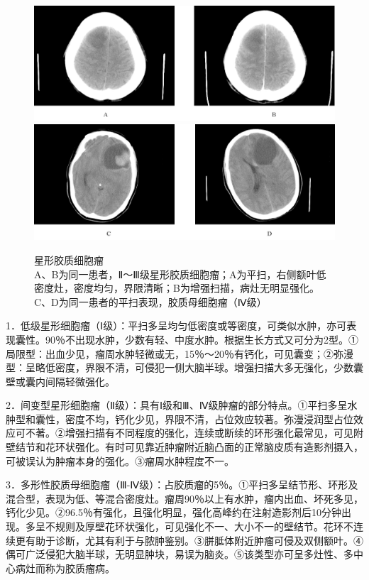 \begin{figure}[!htbp]
 \centering
 \includegraphics[width=.7\textwidth,height=\textheight,keepaspectratio]{./images/Image00066.jpg}
 \includegraphics[width=.7\textwidth,height=\textheight,keepaspectratio]{./images/Image00067.jpg}
 \captionsetup{justification=centering}
 \caption{星形胶质细胞瘤\\{\small A、B为同一患者，Ⅱ～Ⅲ级星形胶质细胞瘤；A为平扫，右侧额叶低密度灶，密度均匀，界限清晰；B为增强扫描，病灶无明显强化。C、D为同一患者的平扫表现，胶质母细胞瘤（Ⅳ级）}}
 \label{fig2-39}
  \end{figure} 

1．低级星形细胞瘤（Ⅰ级）：平扫多呈均匀低密度或等密度，可类似水肿，亦可表现囊性。90％不出现水肿，少数有轻、中度水肿。根据生长方式又可分为2型。①局限型：出血少见，瘤周水肿轻微或无，15％～20％有钙化，可见囊变；②弥漫型：呈略低密度，界限不清，可侵犯一侧大脑半球。增强扫描大多无强化，少数囊壁或囊内间隔轻微强化。

2．间变型星形细胞瘤（Ⅱ级）：具有Ⅰ级和Ⅲ、Ⅳ级肿瘤的部分特点。①平扫多呈水肿型和囊性，密度不均，钙化少见，界限不清，占位效应较著。弥漫浸润型占位效应可不著。②增强扫描有不同程度的强化，连续或断续的环形强化最常见，可见附壁结节和花环状强化。有时可见靠近肿瘤附近脑凸面的正常脑皮质有造影剂摄入，可被误认为肿瘤本身的强化。③瘤周水肿程度不一。

3．多形性胶质母细胞瘤（Ⅲ-Ⅳ级）：占胶质瘤的5％。①平扫多呈结节形、环形及混合型，表现为低、等混合密度灶。瘤周90％以上有水肿，瘤内出血、坏死多见，钙化少见。②96.5％有强化，且强化明显，强化高峰约在注射造影剂后10分钟出现。多呈不规则及厚壁花环状强化，可见强化不一、大小不一的壁结节。花环不连续更有助于诊断，尤其有利于与脓肿鉴别。③胼胝体附近肿瘤可侵及双侧额叶。④偶可广泛侵犯大脑半球，无明显肿块，易误为脑炎。⑤该类型亦可呈多灶性、多中心病灶而称为胶质瘤病。


